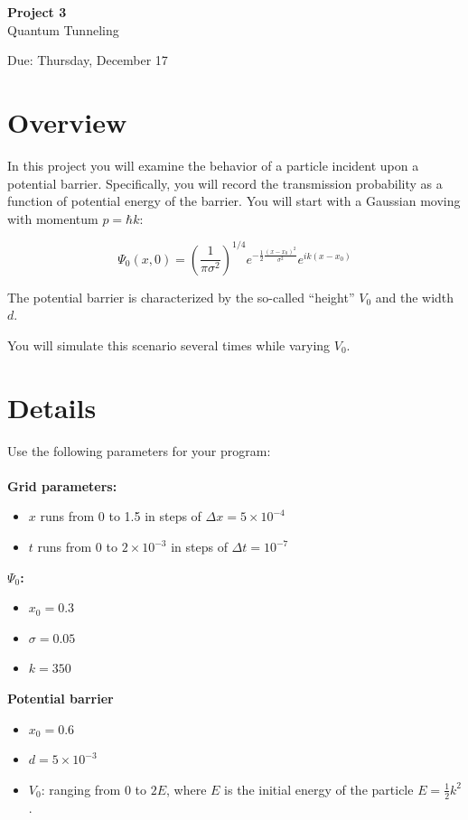 \documentclass{article}
\begin{document}
\fancyfoot[C]{\thepage}
\vspace*{0cm}
\begin{center}
	{\LARGE \textbf{Project 3}}\\
	\vspace{0.25cm}
	{\Large Quantum Tunneling}
	
	{\Large Due: Thursday, December 17}
\end{center}

\newcommand{\textbook}{\textit{Giordano}}

\section*{Overview}
In this project you will examine the behavior of a particle incident upon a potential barrier. Specifically, you will record the transmission probability as a function of potential energy of the barrier. You will start with a Gaussian moving with momentum $p=\hbar k$:

\begin{equation}
 \Psi_0(x,0)=\left(\frac{1}{\pi\sigma^2}\right)^{1/4}e^{-\frac{1}{2}\frac{\left(x-x_0\right)^2}{\sigma^2}}e^{ik(x-x_0)}
\end{equation}

The potential barrier is characterized by the so-called ``height'' $V_0$ and the width $d$. 

You will simulate this scenario several times while varying $V_0$.

\section*{Details}
Use the following parameters for your program:\\
\\
\textbf{Grid parameters:}
\begin{itemize}
	\item $x$ runs from 0 to 1.5 in steps of $\Delta x=5\times 10^{-4}$
	\item $t$ runs from 0 to $2\times10^{-3}$ in steps of $\Delta t=10^{-7}$
\end{itemize}
\textbf{$\Psi_0$:}
\begin{itemize}
	\item $x_0=0.3$
	\item $\sigma = 0.05$
	\item $k=350$
\end{itemize}
\textbf{Potential barrier}
\begin{itemize}
	\item $x_0=0.6$
	\item $d=5\times10^{-3}$
	\item $V_0$: ranging from $0$ to $2E$, where $E$ is the initial energy of the particle $E=\frac{1}{2}k^2$.
\end{itemize}
\end{document}
